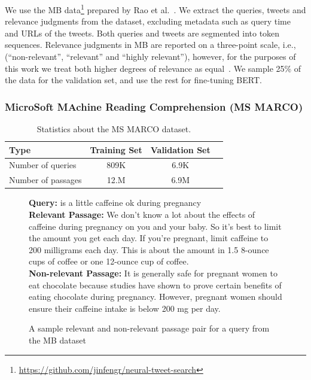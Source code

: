 We use the MB data\footnote{\url{https://github.com/jinfengr/neural-tweet-search}} prepared by Rao et al.~\cite{rao2019tweet}.
We extract the queries, tweets and relevance judgments from the dataset, excluding metadata such as query time and URLs of the tweets.
Both queries and tweets are segmented into token sequences.
Relevance judgments in MB are reported on a three-point scale, i.e., (``non-relevant'', ``relevant'' and ``highly relevant''), however, for the purposes of this work we treat both higher degrees of relevance as equal~\cite{ounisoverview}.
We sample 25\% of the data for the validation set, and use the rest for fine-tuning BERT.

\subsubsection{MicroSoft MAchine Reading Comprehension (MS MARCO)}

\begin{table}[b]
\vspace{0.2cm}
\centering
\begin{tabular}{lccc}
\toprule
\textbf{Type} \mbox{\hspace{0.5cm}} & \textbf{Training Set} \mbox{\hspace{1.0cm}} & \textbf{Validation Set} \mbox{\hspace{1.0cm}} \\
\toprule
Number of queries & 809K & 6.9K \\
Number  of passages & 12.M & 6.9M \\
\bottomrule
\end{tabular}
\vspace{0.2cm}
\caption{Statistics about the MS MARCO dataset.}
\label{tab:marco-stats}
\end{table}

\begin{figure}[b!]
	\begin{framed}
    		\textbf{Query:} is a little caffeine ok during pregnancy \\
    		\textbf{Relevant Passage:} We don't know a lot about the effects of caffeine during pregnancy on you and your baby. So it's best to limit the amount you get each day. If you're pregnant, limit caffeine to 200 milligrams each day. This is about the amount in 1.5 8-ounce cups of coffee or one 12-ounce cup of coffee. \\
    		\textbf{Non-relevant Passage:} It is generally safe for pregnant women to eat chocolate because studies have shown to prove certain benefits of eating chocolate during pregnancy. However, pregnant women should ensure their caffeine intake is below 200 mg per day. \\
	\end{framed}
\label{marco-example}
 \caption{A sample relevant and non-relevant passage pair for a query from the MB dataset}
\end{figure}

